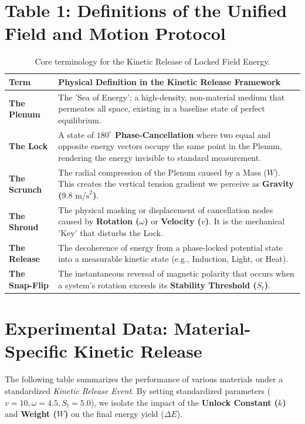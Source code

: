 \documentclass[11pt]{article}
\begin{document}
\section*{Table 1: Definitions of the Unified Field and Motion Protocol}

\begin{table}[h!]
\centering
\begin{tabular}{|p{3cm}|p{10cm}|}
\hline
\textbf{Term} & \textbf{Physical Definition in the Kinetic Release Framework} \\ \hline
\textbf{The Plenum} & The 'Sea of Energy'; a high-density, non-material medium that permeates all space, existing in a baseline state of perfect equilibrium. \\ \hline
\textbf{The Lock} & A state of \textbf{$180^\circ$ Phase-Cancellation} where two equal and opposite energy vectors occupy the same point in the Plenum, rendering the energy invisible to standard measurement. \\ \hline
\textbf{The Scrunch} & The radial compression of the Plenum caused by a Mass ($W$). This creates the vertical tension gradient we perceive as \textbf{Gravity ($9.8 \text{ m/s}^2$)}. \\ \hline
\textbf{The Shroud} & The physical masking or displacement of cancellation nodes caused by \textbf{Rotation ($\omega$)} or \textbf{Velocity ($v$)}. It is the mechanical 'Key' that disturbs the Lock. \\ \hline
\textbf{The Release} & The decoherence of energy from a phase-locked potential state into a measurable kinetic state (e.g., Induction, Light, or Heat). \\ \hline
\textbf{The Snap-Flip} & The instantaneous reversal of magnetic polarity that occurs when a system's rotation exceeds its \textbf{Stability Threshold ($S_t$)}. \\ \hline
\end{tabular}
\caption{Core terminology for the Kinetic Release of Locked Field Energy.}
\end{table}

\section*{Experimental Data: Material-Specific Kinetic Release}

The following table summarizes the performance of various materials under a standardized \textit{Kinetic Release Event}. By setting standardized parameters ($v=10, \omega=4.5, S_t=5.0$), we isolate the impact of the \textbf{Unlock Constant ($k$)} and \textbf{Weight ($W$)} on the final energy yield ($\Delta E$).
\end{document}
